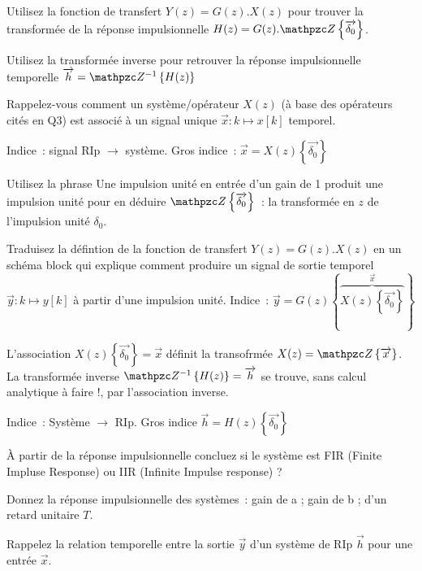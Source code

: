 
Utilisez la fonction de transfert $Y(z) = G(z) . X(z)$ pour trouver la
transformée de la réponse impulsionnelle
$H(z) = G(z) . \tZde{\vec{\delta_0}}$.

Utilisez la transformée inverse pour retrouver la réponse
impulsionnelle temporelle $\vec{h} = \tZiDe{H(z)}$

\begin{remarque}
  Rappelez-vous comment un système/opérateur $X(z)$ (à base des
  opérateurs cités en Q3) est associé à un signal unique
  $\vec{x}: k\mapsto x[k]$ temporel.

  Indice~: signal RIp $\to$ système. Gros indice~:
  $\vec{x}=X (z)\!\left\{\vec{\delta_0}\right\}$

  Utilisez la phrase \og{}Une impulsion unité en entrée d'un gain de 1
  produit une impulsion unité\fg{} pour en déduire $\tZde{\vec{\delta_0}}$~: la transformée en
  $z$ de l'impulsion unité $\delta_0$.

  Traduisez la défintion de la fonction de transfert
  $Y(z) = G(z) . X(z)$ en un schéma block qui explique comment
  produire un signal de sortie temporel $\vec{y}: k \mapsto y[k]$ à
  partir d'une impulsion unité. Indice~:
  $\vec{y}=G(z)\left\{\overbrace{ X(z)\!\left\{ \vec{\delta_0} \right\}}^{\vec{x}} \right\}$

  L'association $X (z)\!\left\{\vec{\delta_0}\right\}=\vec{x}$ définit
  la transofrmée $X(z) = \tZde{\vec{x}}$. La transformée inverse $\tZiDe{H(z)}=\vec{h}$
  se trouve, sans calcul analytique à faire !, par l'association inverse.

  Indice~: Système  $\to$ RIp. Gros indice $\vec{h} = H(z)\!\left\{\vec{\delta_0}\right\}$

\end{remarque}

À partir de la réponse impulsionnelle concluez si le système est
FIR (Finite Impluse Response) ou IIR (Infinite Impulse response) ?


 

Donnez la réponse impulsionnelle des systèmes~: \og{} gain de a\fg{} ; \og{} gain de b\fg{} ; d'un retard unitaire $T$.

Rappelez la relation temporelle entre la sortie $\vec{y}$ d'un système de RIp $\vec{h}$ pour une entrée $\vec{x}$.

